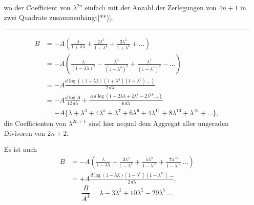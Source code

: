 \noindent wo der Coefficient von $\lambda^{2n}$ einfach mit der Anzahl der Zerlegungen von $4n+1$ in zwei Quadrate zusammenhängt[**)],
\par\bigskip\noindent\rule{.25\linewidth}{.4pt}\par\smallskip
{\small\par{}\par}
\clearpage{}
\[\begin{aligned}
B&=-A\left(\frac\lambda{1+\lambda\lambda}+\frac{2\lambda^3}{1+\lambda^4}+\frac{3\lambda^5}{1+\lambda^6}+{.}{.}{.}\right)\\[4pt]
&=-A\left(\frac\lambda{(1-\lambda\lambda)^2}-\frac{\lambda^3}{(1-\lambda^4)^2}+\frac{\lambda^5}{(1-\lambda^6)^2}-{.}{.}{.}\right)\\[4pt]
&=-A\frac{d\log((1+\lambda\lambda)(1+\lambda^4)(1+\lambda^6)\,{.}{.}{.})}{2\,d\lambda}\\[4pt]
&=-A\frac{d\log A}{12\,d\lambda}+\frac{A\,d\log(1-2\lambda\lambda+2\lambda^8-2\lambda^{18}\,{.}{.}{.})}{6\,d\lambda}\\[4pt]
&=-A\{\lambda+\lambda^3+4\lambda^5+\lambda^7+6\lambda^9+4\lambda^{11}+8\lambda^{13}+\lambda^{15}+{.}{.}{.}\},
\end{aligned}\]
\noindent die Coefficienten von $\lambda^{2n+1}$ sind hier aequal dem Aggregat aller ungeraden Divisoren von $2n+2$.
\par\indent Es ist auch
\[\begin{aligned}
B&=-A\left(\frac\lambda{1-\lambda\lambda}+\frac{3\lambda^5}{1-\lambda^6}+\frac{5\lambda^9}{1-\lambda^{10}}+\frac{7\lambda^{13}}{1-\lambda^{14}}\,{.}{.}{.}\right)\\[4pt]
&=+A\frac{d\log(1-\lambda\lambda)(1-\lambda^6)(1-\lambda^{10})\,{.}{.}{.}}{2\,d\lambda},
\end{aligned}\]
\[\frac B{A^3}=\lambda-3\lambda^3+10\lambda^5-29\lambda^7\,{.}{.}{.}\]
\clearpage
\endgroup
